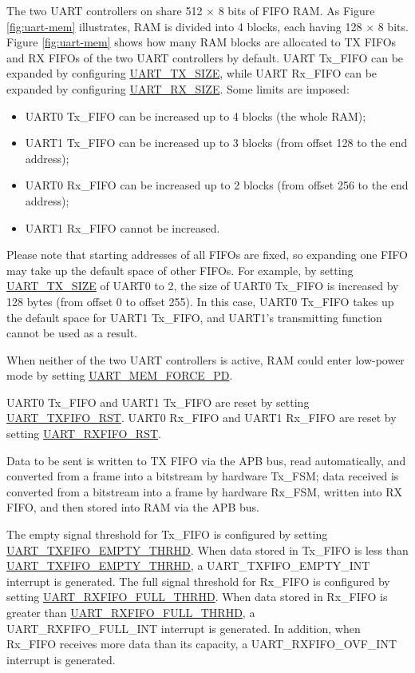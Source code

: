\documentclass[main\_\_EN.tex]{subfiles}
\begin{document}
The two UART controllers on \chipname{} share 512 × 8 bits of FIFO RAM. As Figure \ref{fig:uart-mem} illustrates, RAM is divided into 4 blocks, each having 128 × 8 bits. Figure \ref{fig:uart-mem} shows how many RAM blocks are allocated to TX FIFOs and RX FIFOs of the two UART controllers by default. UART Tx\_FIFO can be expanded by configuring \hyperref[fielddesc:UARTTXSIZE]{UART\_TX\_SIZE}, while UART Rx\_FIFO can be expanded by configuring \hyperref[fielddesc:UARTRXSIZE]{UART\_RX\_SIZE}.
Some limits are imposed:
\begin{itemize}
    \item UART0 Tx\_FIFO can be increased up to 4 blocks (the whole RAM);
    \item UART1 Tx\_FIFO can be increased up to 3 blocks (from offset 128 to the end address);
    \item UART0 Rx\_FIFO can be increased up to 2 blocks (from offset 256 to the end address);
    \item UART1 Rx\_FIFO cannot be increased.
\end{itemize}
Please note that starting addresses of all FIFOs are fixed, so expanding one FIFO may take up the default space of other FIFOs. For example, by setting \hyperref[fielddesc:UARTTXSIZE]{UART\_TX\_SIZE} of UART0 to 2, the size of UART0 Tx\_FIFO is increased by 128 bytes (from offset 0 to offset 255). In this case, UART0 Tx\_FIFO takes up the default space for UART1 Tx\_FIFO, and UART1's transmitting function cannot be used as a result.

When neither of the two UART controllers is active, RAM could enter low-power mode by setting \hyperref[fielddesc:UARTMEMFORCEPD]{UART\_MEM\_FORCE\_PD}.

UART0 Tx\_FIFO and UART1 Tx\_FIFO are reset by setting \hyperref[fielddesc:UARTTXFIFORST]{UART\_TXFIFO\_RST}. UART0 Rx\_FIFO and UART1 Rx\_FIFO are reset by setting \hyperref[fielddesc:UARTRXFIFORST]{UART\_RXFIFO\_RST}.

Data to be sent is written to TX FIFO via the APB bus, read automatically, and converted from a frame into a bitstream by hardware Tx\_FSM; data received is converted from a bitstream into a frame by hardware Rx\_FSM, written into RX FIFO, and then stored into RAM via the APB bus.

The empty signal threshold for Tx\_FIFO is configured by setting \hyperref[fielddesc:UARTTXFIFOEMPTYTHRHD]{UART\_TXFIFO\_EMPTY\_THRHD}. When data stored in Tx\_FIFO is less than \hyperref[fielddesc:UARTTXFIFOEMPTYTHRHD]{UART\_TXFIFO\_EMPTY\_THRHD}, a UART\_TXFIFO\_EMPTY\_INT interrupt is generated. The full signal threshold for Rx\_FIFO is configured by setting \hyperref[fielddesc:UARTRXFIFOFULLTHRHD]{UART\_RXFIFO\_FULL\_THRHD}. When data stored in Rx\_FIFO is greater than \hyperref[fielddesc:UARTRXFIFOFULLTHRHD]{UART\_RXFIFO\_FULL\_THRHD}, a UART\_RXFIFO\_FULL\_INT interrupt is generated. In addition, when Rx\_FIFO receives more data than its capacity, a UART\_RXFIFO\_OVF\_INT interrupt is generated.
\end{document}
